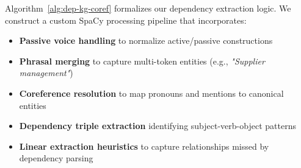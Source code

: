 \documentclass[runningheads]{llncs}
\begin{document}
Algorithm~\ref{alg:dep-kg-coref} formalizes our dependency extraction logic. We construct a custom SpaCy processing pipeline that incorporates:

\begin{itemize}
\item \textbf{Passive voice handling} to normalize active/passive constructions
\item \textbf{Phrasal merging} to capture multi-token entities (e.g., \textit{"Supplier management"})
\item \textbf{Coreference resolution} to map pronouns and mentions to canonical entities
\item \textbf{Dependency triple extraction} identifying subject-verb-object patterns
\item \textbf{Linear extraction heuristics} to capture relationships missed by dependency parsing
\end{itemize}
\end{document}
